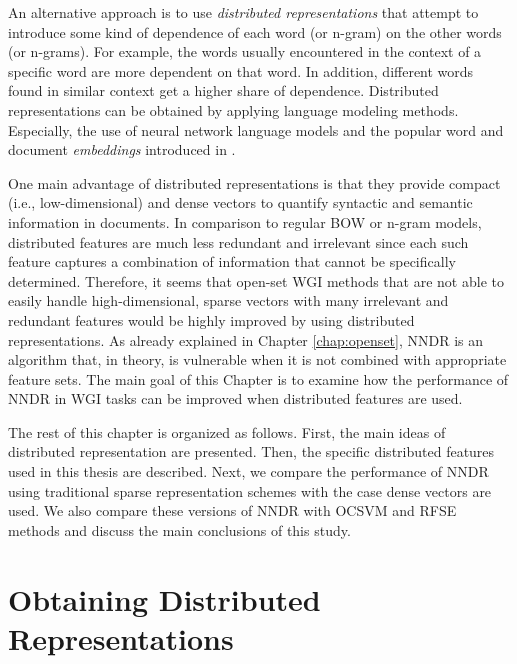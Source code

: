 An alternative approach is to use \textit{distributed representations} that attempt to introduce some kind of dependence of each word (or n-gram) on the other words (or n-grams). For example, the words usually encountered in the context of a specific word are more dependent on that word. In addition, different words found in similar context get a higher share of dependence. Distributed representations can be obtained by applying language modeling methods. Especially, the use of neural network language models and the popular word and document \textit{embeddings} introduced in . 

One main advantage of distributed representations is that they provide compact (i.e., low-dimensional) and dense vectors to quantify syntactic and semantic information in documents. In comparison to regular BOW or n-gram models, distributed features are much less redundant and irrelevant since each such feature captures a combination of information that cannot be specifically determined. Therefore, it seems that open-set WGI methods that are not able to easily handle high-dimensional, sparse vectors with many irrelevant and redundant features would be highly improved by using distributed representations. As already explained in Chapter \ref{chap:openset}, NNDR is an algorithm that, in theory, is vulnerable when it is not combined with appropriate feature sets. The main goal of this Chapter is to examine how the performance of NNDR in WGI tasks can be improved when distributed features are used. 

The rest of this chapter is organized as follows. First, the main ideas of distributed representation are presented. Then, the specific distributed features used in this thesis are described. Next, we compare the performance of NNDR using traditional sparse representation schemes with the case dense vectors are used. We also compare these versions of NNDR with OCSVM and RFSE methods and discuss the main conclusions of this study.

\section{Obtaining Distributed Representations}



